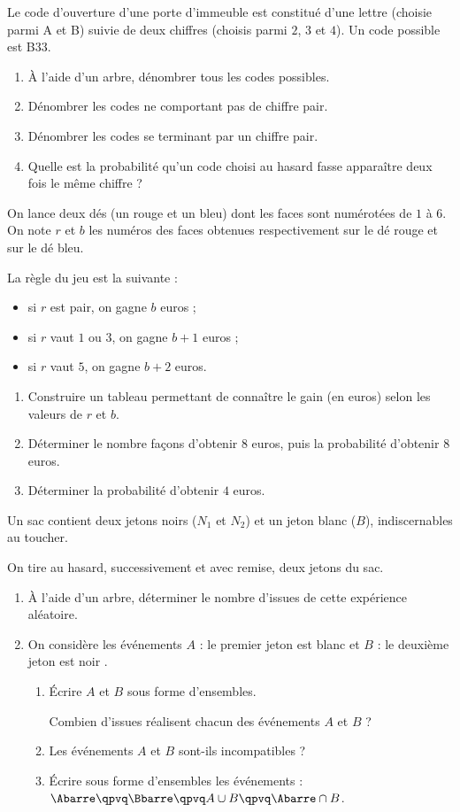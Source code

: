 \exo

Le code d'ouverture d'une porte d'immeuble est constitué d'une lettre (choisie parmi A et B) suivie de deux chiffres (choisis parmi $2$, $3$ et $4$). Un code possible est B33.
\begin{enumerate}
\item À l'aide d'un arbre, dénombrer tous les codes possibles.
\item Dénombrer les codes ne comportant pas de chiffre pair.
\item Dénombrer les codes se terminant par un chiffre pair.
\item Quelle est la probabilité qu'un code choisi au hasard fasse apparaître deux fois le même chiffre ?
\end{enumerate}

\exo

On lance deux dés (un rouge et un bleu) dont les faces sont numérotées de $1$ à $6$. On note $r$ et $b$ les numéros des faces obtenues respectivement sur le dé rouge et sur le dé bleu.

La règle du jeu est la suivante :
\begin{itemize}
\item si $r$ est pair, on gagne $b$ euros ;
\item si $r$ vaut $1$ ou $3$, on gagne $b+1$ euros ;
\item si $r$ vaut $5$, on gagne $b+2$ euros.
\end{itemize}
\begin{enumerate}
\item Construire un tableau permettant de connaître le gain (en euros) selon les valeurs de $r$ et $b$.
\item Déterminer le nombre façons d'obtenir $8$ euros, puis la probabilité d'obtenir $8$ euros.
\item Déterminer la probabilité d'obtenir $4$ euros.
\end{enumerate}

\exo

Un sac contient deux jetons noirs ($N_1$ et $N_2$) et un jeton blanc ($B$), indiscernables au toucher.

On tire au hasard, successivement et avec remise, deux jetons du sac.
\begin{enumerate}
\item À l'aide d'un arbre, déterminer le nombre d'issues de cette expérience aléatoire.
\item On considère les événements $A$ : \og le premier jeton est blanc \fg{} et $B$ : \og le deuxième jeton est noir \fg{} .
\begin{enumerate}
\item Écrire $A$ et $B$ sous forme d'ensembles.

Combien d'issues réalisent chacun des événements $A$ et $B$ ?
\item Les événements $A$ et $B$ sont-ils incompatibles ?
\item Écrire sous forme d'ensembles les événements : \quad $\Abarre\qpvq \Bbarre \qpvq A\cup B\qpvq\Abarre\cap B$.
\end{enumerate}
\end{enumerate}

